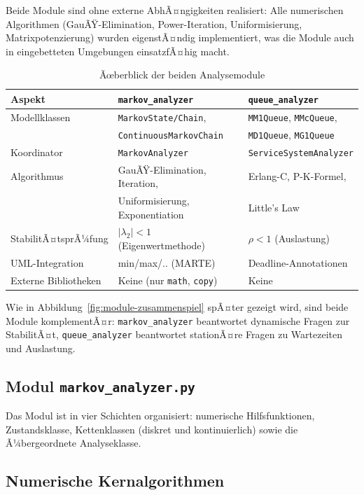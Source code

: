 ﻿\documentclass[a4paper,12pt]{report}
\theoremstyle{definition}
\begin{document}
Beide Module sind ohne externe AbhÃ¤ngigkeiten realisiert: Alle numerischen
Algorithmen (GauÃŸ-Elimination, Power-Iteration, Uniformisierung,
Matrixpotenzierung) wurden eigenstÃ¤ndig implementiert, was die Module
auch in eingebetteten Umgebungen einsatzfÃ¤hig macht.

\begin{table}[H]
	\centering
	\begin{tabular}{@{}lll@{}}
		\toprule
		\textbf{Aspekt} & \textbf{\texttt{markov\_analyzer}} & \textbf{\texttt{queue\_analyzer}} \\
		\midrule
		Modellklassen & \texttt{MarkovState/Chain}, &
		\texttt{MM1Queue}, \texttt{MMcQueue}, \\
		& \texttt{ContinuousMarkovChain} & \texttt{MD1Queue}, \texttt{MG1Queue} \\
		Koordinator & \texttt{MarkovAnalyzer} & \texttt{ServiceSystemAnalyzer} \\
		Algorithmus & GauÃŸ-Elimination, Iteration, & Erlang-C, P-K-Formel, \\
		& Uniformisierung, Exponentiation & Little's Law \\
		StabilitÃ¤tsprÃ¼fung & $|\lambda_2| < 1$ (Eigenwertmethode) & $\rho < 1$ (Auslastung) \\
		UML-Integration & min/max/.. (MARTE) & Deadline-Annotationen \\
		Externe Bibliotheken & Keine (nur \texttt{math}, \texttt{copy}) & Keine \\
		\bottomrule
	\end{tabular}
	\caption{Ãœberblick der beiden Analysemodule}
\label{tab:modul-overview}
	\label{tab:module-uebersicht}
\end{table}

Wie in Abbildung~\ref{fig:module-zusammenspiel} spÃ¤ter gezeigt wird, sind beide Module komplementÃ¤r: \texttt{markov\_analyzer} beantwortet dynamische Fragen zur StabilitÃ¤t, \texttt{queue\_analyzer} beantwortet stationÃ¤re Fragen zu Wartezeiten und Auslastung.

\subsection{Modul \texttt{markov\_analyzer.py}}
\label{sec:markov-analyzer-impl}

Das Modul ist in vier Schichten organisiert: numerische Hilfsfunktionen,
Zustandsklasse, Kettenklassen (diskret und kontinuierlich) sowie die
Ã¼bergeordnete Analyseklasse.

\subsection{Numerische Kernalgorithmen}
\end{document}
